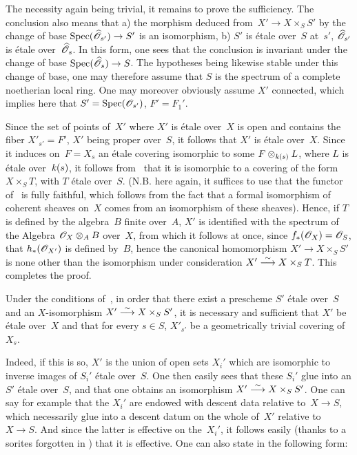 The necessity again being trivial, it remains to prove the
sufficiency. The conclusion also means that a) the morphism deduced
from~$X'\to X\times_S S'$ by the change of base
$\Spec(\widehat{\cal{O}}_{s'})\to S'$ is an isomorphism, b) $S'$ is
étale over~$S$ at~$s'$, \ie $\widehat{\cal{O}}_{s'}$ is étale
over~$\widehat{\cal{O}}_s$. In this form, one sees that the conclusion
is invariant under the change of base $\Spec(\widehat{\cal{O}}_s)\to
S$. The hypotheses being likewise stable under this change of base, one
may therefore assume that $S$ is the spectrum of a complete noetherian
local ring. One may moreover obviously assume $X'$ connected, which
implies here that $S'=\Spec(\cal{O}_{s'})$, $F'=F_1'$.

Since
the set of points of~$X'$ where $X'$ is étale over~$X$ is open and
contains the fiber $X'_{s'}=F'$, $X'$ being proper over~$S$, it
follows that $X'$ is étale over~$X$. Since it induces on~$F=X_s$ an
étale covering isomorphic to some $F\otimes_{\mathit{k}(s)}L$, where $L$ is
étale over~$\mathit{k}(s)$, it follows from~ that it is
isomorphic to a covering of the form $X\times_S T$, with $T$ étale
over~$S$. (N.B. here again, it suffices to use that the functor
of~ is fully faithful, which follows from the fact that a
formal isomorphism of coherent sheaves on~$X$ comes from an isomorphism
of these sheaves). Hence, if $T$ is defined by the algebra~$B$ finite
over~$A$, $X'$ is identified with the spectrum of the Algebra
$\cal{O}_X\otimes_A B$ over~$X$, from which it follows at once, since
$f_*(\cal{O}_X)=\cal{O}_S$, that $h_*(\cal{O}_{X'})$ is defined
by~$B$, hence the canonical homomorphism $X'\to X\times_S S'$ is none
other than the isomorphism under consideration $X'\overset{\sim}{\longrightarrow} X\times_S T$.
This completes the proof.

\begin{corollary}
\label{IX.6.7}
Under the conditions of~, in order that there exist a
prescheme $S'$ étale over~$S$ and an $X$-isomorphism $X'\overset{\sim}{\longrightarrow}
X\times_S S'$, it is necessary and sufficient that $X'$ be étale
over~$X$ and that for every $s\in S$, $X'_{s'}$ be a geometrically
trivial covering of~$X_s$.
\end{corollary}

Indeed, if this is so, $X'$ is the union of open sets $X_i'$ which are
isomorphic to inverse images of $S_i'$ étale over~$S$. One then easily
sees that these $S_i'$ glue into an $S'$ étale over~$S$, and that one
obtains an isomorphism $X'\overset{\sim}{\longrightarrow} X\times_S S'$. One can say for
example that the $X_i'$ are endowed with descent data relative
to~$X\to S$, which necessarily glue into a descent datum on the whole
of~$X'$ relative to~$X\to S$. And since the latter is effective on
the~$X_i'$, it follows easily (thanks to a sorites forgotten in
\No{}) that it is effective. One can also state 
in the following form:

